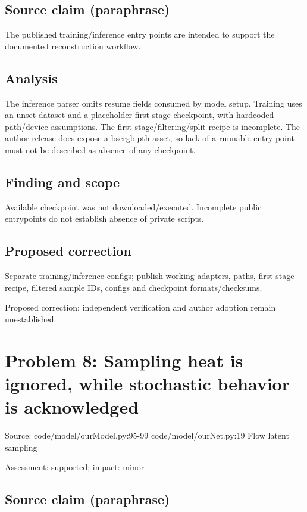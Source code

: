 \documentclass[11pt]{article}
\begin{document}
\subsection*{Source claim (paraphrase)}

The published training/inference entry points are intended to support the documented reconstruction workflow.

\subsection*{Analysis}

The inference parser omits resume fields consumed by model setup. Training uses an unset dataset and a placeholder first-stage checkpoint, with hardcoded path/device assumptions. The first-stage/filtering/split recipe is incomplete. The author release does expose a bsergb.pth asset, so lack of a runnable entry point must not be described as absence of any checkpoint.

\subsection*{Finding and scope}

Available checkpoint was not downloaded/executed. Incomplete public entrypoints do not establish absence of private scripts.

\subsection*{Proposed correction}

Separate training/inference configs; publish working adapters, paths, first-stage recipe, filtered sample IDs, configs and checkpoint formats/checksums.

Proposed correction; independent verification and author adoption remain unestablished.

\section*{Problem 8: Sampling heat is ignored, while stochastic behavior is acknowledged}

Source: code/model/ourModel.py:95-99 code/model/ourNet.py:19 Flow latent sampling

Assessment: supported; impact: minor

\subsection*{Source claim (paraphrase)}
\end{document}
